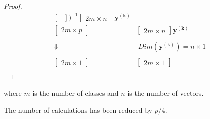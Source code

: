 \begin{proof}
\begin{equation*}
\begin{split}
\begin{bmatrix}
	\end{bmatrix} \biggr)^{-1} 
	\begin{bmatrix}
		2m \times n 
	\end{bmatrix} \mathbf{y^{(k)}} \\ %
	\begin{bmatrix}
		2m \times p
	\end{bmatrix}
	= &
	\begin{bmatrix}
		2m \times n 
	\end{bmatrix} \mathbf{y^{(k)}} \\ %
	& \\
	\Downarrow & \; Dim(\mathbf{y^{(k)}}) = n \times 1 \\ %
	& \\
	\begin{bmatrix}
		2m \times 1
	\end{bmatrix}
	= &
	\begin{bmatrix}
		2m \times 1 
	\end{bmatrix} \\ %
	\end{split}
\end{equation*}
\end{proof}
where $m$ is the number of classes and $n$ is the number of vectors.

The number of calculations has been reduced by $p/4$.
